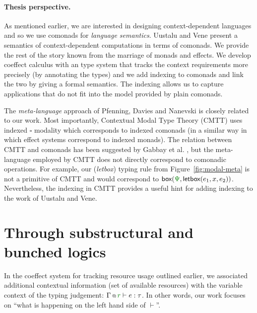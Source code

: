   
\paragraph{Thesis perspective.}
As mentioned earlier, we are interested in designing context-dependent languages and so we
use comonads for \emph{language semantics}. Uustalu and Vene present a semantics of 
context-dependent computations in terms of comonads. We provide the rest of the story known 
from the marriage of monads and effects. We develop coeffect calculus with an type system that 
tracks the context requirements more precisely (by annotating the types) and we add indexing 
to comonads and link the two by giving a formal semantics. The indexing allows us to capture 
applications that do not fit into the model provided by plain comonads.

The \emph{meta-language} approach of Pfenning, Davies and Nanevski is closely related to
our work. Most importantly, Contextual Modal Type Theory (CMTT) uses indexed $\square$ modality
which corresponds to indexed comonads (in a similar way in which effect systems correspond to 
indexed monads). The relation between CMTT and comonads has been suggested by
Gabbay et al. \cite{logic-cmtt-semantics}, but the meta-language employed by CMTT does not 
directly correspond to comonadic operations. For example, our (\emph{letbox}) typing rule from
Figure~\ref{fig:modal-meta} is not a primitive of CMTT and would correspond to 
$\ident{box}(\cclrd{\Psi}, \ident{letbox}(e_1, x, e_2))$. Nevertheless, the indexing in 
CMTT provides a useful hint for adding indexing to the work of Uustalu and Vene.


\section{Through substructural and bunched logics}
\label{sec:path-logic}

In the coeffect system for tracking resource usage outlined earlier, we associated additional
contextual information (set of available resources) with the variable context of the typing 
judgement: $\coctx{\Gamma}{\cclrd{r}} \vdash e : \tau$. In other words, our work focuses on 
``what is happening on the left hand side of $\vdash$''.

